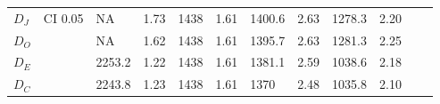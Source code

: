 \begin{table*}[h]
\begin{tabular}{|l|l|llllllllll|}
\hline
$D_J$   & \multirow{4}{*}{CI 0.05} & NA           & 1.73          & 1438         & 1.61          & 1400.6       & 2.63         & 1278.3     & 2.20        &             &             \\
$D_O$    &                           & NA           & 1.62          & 1438         & 1.61          & 1395.7       & 2.63         & 1281.3     & 2.25        &             &             \\
$D_E$ &                           & 2253.2       & 1.22          & 1438         & 1.61          & 1381.1       & 2.59         & 1038.6     & 2.18        &             &             \\
$D_C$    &                           & 2243.8       & 1.23          & 1438         & 1.61          & 1370         & 2.48         & 1035.8     & 2.10        &             &            \\
\hline
\end{tabular}
\end{table*}
